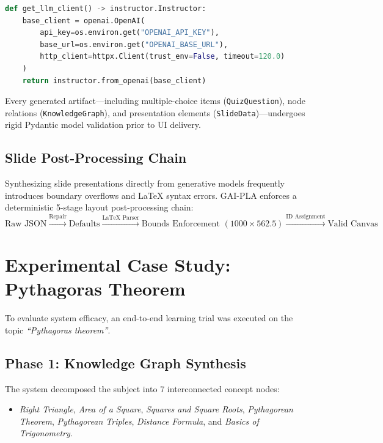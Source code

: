 \documentclass[12pt,a4paper]{article}
\begin{document}
\begin{lstlisting}[language=Python, caption={LLM Client Configuration with Structured Pydantic Output}]
def get_llm_client() -> instructor.Instructor:
    base_client = openai.OpenAI(
        api_key=os.environ.get("OPENAI_API_KEY"),
        base_url=os.environ.get("OPENAI_BASE_URL"),
        http_client=httpx.Client(trust_env=False, timeout=120.0)
    )
    return instructor.from_openai(base_client)
\end{lstlisting}

Every generated artifact—including multiple-choice items (\texttt{QuizQuestion}), node relations (\texttt{KnowledgeGraph}), and presentation elements (\texttt{SlideData})—undergoes rigid Pydantic model validation prior to UI delivery.

\subsection{Slide Post-Processing Chain}
Synthesizing slide presentations directly from generative models frequently introduces boundary overflows and LaTeX syntax errors. GAI-PLA enforces a deterministic 5-stage layout post-processing chain:
\begin{equation}
\text{Raw JSON} \xrightarrow{\text{Repair}} \text{Defaults} \xrightarrow{\text{LaTeX Parser}} \text{Bounds Enforcement } (1000 \times 562.5) \xrightarrow{\text{ID Assignment}} \text{Valid Canvas}
\end{equation}

\section{Experimental Case Study: Pythagoras Theorem}

To evaluate system efficacy, an end-to-end learning trial was executed on the topic \textit{``Pythagoras theorem''}.

\subsection{Phase 1: Knowledge Graph Synthesis}
The system decomposed the subject into 7 interconnected concept nodes:
\begin{itemize}
    \item \textit{Right Triangle}, \textit{Area of a Square}, \textit{Squares and Square Roots}, \textit{Pythagorean Theorem}, \textit{Pythagorean Triples}, \textit{Distance Formula}, and \textit{Basics of Trigonometry}.
\end{itemize}
\end{document}
